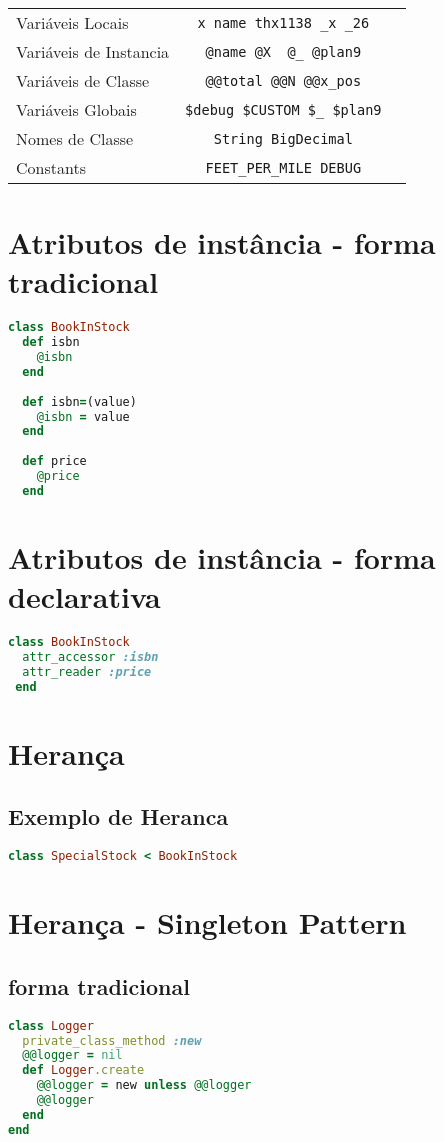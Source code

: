 \documentclass[serif,mathserif]{book}
\begin{document}
\begin{tabular}{ l | c | r }
Variáveis Locais & \verb|x name thx1138 _x _26| \\
Variáveis de Instancia & \verb|@name @X  @_ @plan9| \\
Variáveis de Classe & \verb|@@total @@N @@x_pos| \\
Variáveis Globais & \verb|$debug $CUSTOM $_ $plan9| \\
Nomes de Classe & \verb|String BigDecimal| \\
Constants & \verb|FEET_PER_MILE DEBUG|
\end{tabular}

\section{Atributos de instância - forma tradicional}
\begin{lstlisting}[language=ruby]
class BookInStock  
  def isbn
    @isbn
  end
 
  def isbn=(value)
    @isbn = value
  end
 
  def price
    @price
  end
\end{lstlisting}

\section{Atributos de instância - forma declarativa}
\begin{lstlisting}[language=ruby]
class BookInStock  
  attr_accessor :isbn
  attr_reader :price
 end
\end{lstlisting}

\section{Herança}
\subsection{Exemplo de Heranca}
\begin{lstlisting}[language=ruby]
class SpecialStock < BookInStock
\end{lstlisting}

\section{Herança - Singleton Pattern}

\subsection{forma tradicional}
\begin{lstlisting}[language=ruby]
class Logger
  private_class_method :new
  @@logger = nil
  def Logger.create
    @@logger = new unless @@logger
    @@logger
  end
end
\end{lstlisting}
\end{document}
